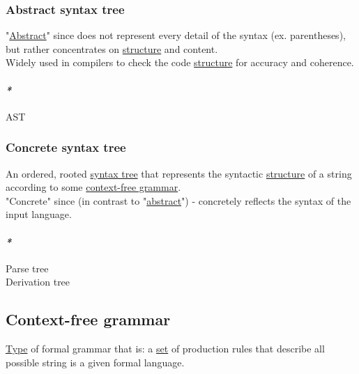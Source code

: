 \documentclass[11pt]{article}
\begin{document}
\subsubsection{\label{org64abae2}Abstract syntax tree}
\label{sec:org7836830}
"\hyperref[org606d002]{Abstract}" since does not represent every detail of the syntax (ex. parentheses), but rather concentrates on \hyperref[org93ee82c]{structure} and content.\\

Widely used in compilers to check the code \hyperref[org93ee82c]{structure} for accuracy and coherence.\\

\paragraph{\emph{*}}
\label{sec:org1d9ba0e}

\label{org0d6c45a}AST\\

\subsubsection{\label{orgfad0f6f}Concrete syntax tree}
\label{sec:org052b654}

An ordered, rooted \hyperref[org66b5ad6]{syntax tree} that represents the syntactic \hyperref[org93ee82c]{structure} of a string according to some \hyperref[org2e74e5e]{context-free grammar}.\\

"Concrete" since (in contrast to "\hyperref[org606d002]{abstract}") - concretely reflects the syntax of the input language.\\

\paragraph{\emph{*}}
\label{sec:org8e02533}

\label{org4491d3c}Parse tree\\
\label{org076b027}Derivation tree\\

\subsection{\label{org2e74e5e}Context-free grammar}
\label{sec:org361c092}
\hyperref[org4fbaeb8]{Type} of formal grammar that is: a \hyperref[orgbed80ba]{set} of production rules that describe all possible string is a given formal language.\\
\end{document}
